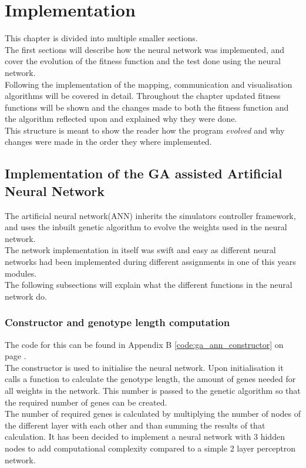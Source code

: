 \chapter{Implementation}
This chapter is divided into multiple smaller sections. \\
The first sections will describe how the neural network was implemented, and cover the evolution of the fitness function and the test done using the neural network. \\
Following the implementation of the mapping, communication and visualisation algorithms will be covered in detail. Throughout the chapter updated fitness functions will be shown and the changes made to both the fitness function and the algorithm reflected upon and explained why they were done. \\
This structure is meant to show the reader how the program \textit{evolved} and why changes were made in the order they where implemented. \\

\section{Implementation of the GA assisted Artificial Neural Network}
The artificial neural network(ANN) inherits the simulators controller framework, and uses the inbuilt genetic algorithm to evolve the weights used in the neural network.\\
The network implementation in itself was swift and easy as different neural networks had been implemented during different assignments in one of this years modules. \\
The following subsections will explain what the different functions in the neural network do.

\subsection{Constructor and genotype length computation}
\label{chap3:ga_ann_constructor}
The code for this can be found in Appendix B \ref{code:ga_ann_constructor} on page \pageref{code:ga_ann_constructor}.\\
The constructor is used to initialise the neural network. Upon initialisation it calls a function to calculate the genotype length, the amount of genes needed for all weights in the network. This number is passed to the genetic algorithm so that the required number of genes can be created.\\
The number of required genes is calculated by multiplying the number of nodes of the different layer with each other and than summing the results of that calculation. 
It has been decided to implement a neural network with 3 hidden nodes to add computational complexity compared to a simple 2 layer perceptron network.


